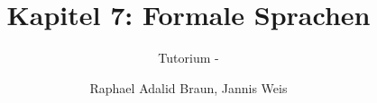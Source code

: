 \documentclass[18pt]{beamer}
\title[Formale Sprachen]{Kapitel 7: Formale Sprachen}
\subtitle{Tutorium - } %
\author{Raphael Adalid Braun, Jannis Weis}
\institute{Grundbegriffe der Informatik | WS 2018/19}
\begin{document}

\begin{frame}
	\titlepage
\end{frame}

\def\showSolutions{1}					 %

\title[Formale Sprachen]{}

\end{document}
